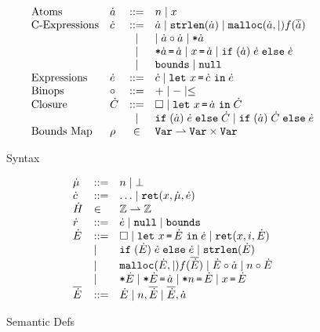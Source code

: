 \begin{figure}[h]
{\small
  \[\begin{array}{llcl}
      \text{Atoms}       & \dot a & ::= & n \mid x \\
      
      \text{C-Expressions} & \dot c & ::= & \dot a \mid \mathtt{strlen}({\dot a})  \mid \mathtt{malloc}({\dot  a},{\mid}) {f}({\overline{\dot a}})  \\
                         & & \mid &  \mid  \dot a \circ \dot a \mid \texttt{*}{\dot a} \\
                         & & \mid & \texttt{*}{\dot a}\,\texttt{=}\, {\dot a} \mid {x}\,\texttt{=}\, {\dot a}  \mid \mathtt{if\;}(\dot a)\;{\dot e}\;\mathtt{else}\;{\dot e} \\
                         & & \mid & \mathtt{bounds} \mid \mathtt{null} \\
      \text{Expressions}  & \dot e & ::= & \dot c \mid \mathtt{let}~x\, \texttt{=}\, \dot c~\mathtt{in}\;{\dot e}\\
      \text{Binops} & \circ & ::= & + \mid - \mid \leq  \\
      \text{Closure} & \dot C & ::= & \Box \mid \mathtt{let}~x\, \texttt{=}\, \dot a~\mathtt{in}\;{\dot C} \\
       & & \mid & \mathtt{if\;}(\dot a)\;{\dot e}\;\mathtt{else}\;{\dot C} \mid \mathtt{if\;}(\dot a)\;{\dot    C}\;\mathtt{else}\;{\dot e} \\
      \text{Bounds Map} & \rho & \in & \texttt{Var} \rightharpoonup \texttt{Var} \times \texttt{Var}
  \end{array}
  \]
}
  \caption{\elang{} Syntax}
  \label{fig:syntaxerased}
{\small
  \[\begin{array}{lll}
    \dot \mu & ::= & n \mid \bot \\
    \dot c & ::= & \ldots  \mid \mathtt{ret}({x},{\dot \mu},{\dot e}) \\
    \dot H & \in & \mathbb{Z} \rightharpoonup \mathbb{Z} \\
    \dot r & ::= & \dot e \mid \mathtt{null} \mid \mathtt{bounds} \\
    \dot E & ::= & \Box \mid  \mathtt{let}~x\, \texttt{=}\, \dot E~\mathtt{in}\;{\dot e}  \mid \mathtt{ret}({x},{i},{\dot E}) \\
             & \mid & \mathtt{if\;}(\dot E)\;{\dot e}\;\mathtt{else}\;{\dot e} \mid \mathtt{strlen}({\dot E}) \\
             & \mid & \mathtt{malloc}({\dot E},{\mid}) {f}({\overline{\dot
                      E}}) \mid \dot E \circ \dot a \mid n \circ \dot E \\
             & \mid & \texttt{*}{\dot E} \mid \texttt{*}{\dot E}\,\texttt{=}\, {\dot a}
                      \mid \texttt{*}{n}\,\texttt{=}\, {\dot E} \mid
                      {x}\,\texttt{=}\, {\dot E} \\
      \overline{\dot E } & ::= & \dot E \mid n,\overline{\dot E} \mid
                                 \overline{\dot E}, \dot a
                      
  \end{array} \]
}
  \caption{\elang Semantic Defs}
  \label{fig:semanticserased}
\end{figure}


